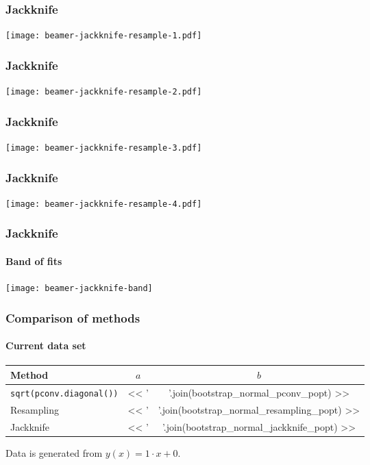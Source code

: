 \documentclass[english, fleqn]{beamer}
\begin{document}
\begin{frame}
    \frametitle{Jackknife}
    \centering
    \texttt{[image: beamer-jackknife-resample-1.pdf]}
\end{frame}

\begin{frame}
    \frametitle{Jackknife}
    \centering
    \texttt{[image: beamer-jackknife-resample-2.pdf]}
\end{frame}

\begin{frame}
    \frametitle{Jackknife}
    \centering
    \texttt{[image: beamer-jackknife-resample-3.pdf]}
\end{frame}

\begin{frame}
    \frametitle{Jackknife}
    \centering
    \texttt{[image: beamer-jackknife-resample-4.pdf]}
\end{frame}

\begin{frame}
    \frametitle{Jackknife}
    \framesubtitle{Band of fits}
    \centering
    \texttt{[image: beamer-jackknife-band]}
\end{frame}

\begin{frame}
    \frametitle{Comparison of methods}
    \framesubtitle{Current data set}
    {
        \centering
        \begin{tabular}{lSS}
            \toprule
            {Method}
            & {$a$}
            & {$b$}
            \\
            \midrule
            \texttt{sqrt(pconv.diagonal())} & << ' & '.join(bootstrap_normal_pconv_popt) >> \\
            Resampling & << ' & '.join(bootstrap_normal_resampling_popt) >> \\
            Jackknife & << ' & '.join(bootstrap_normal_jackknife_popt) >> \\
            \bottomrule
        \end{tabular}
    }

    \pause

    Data is generated from $y(x) = 1 \cdot x + 0$.

\end{frame}
\end{document}
